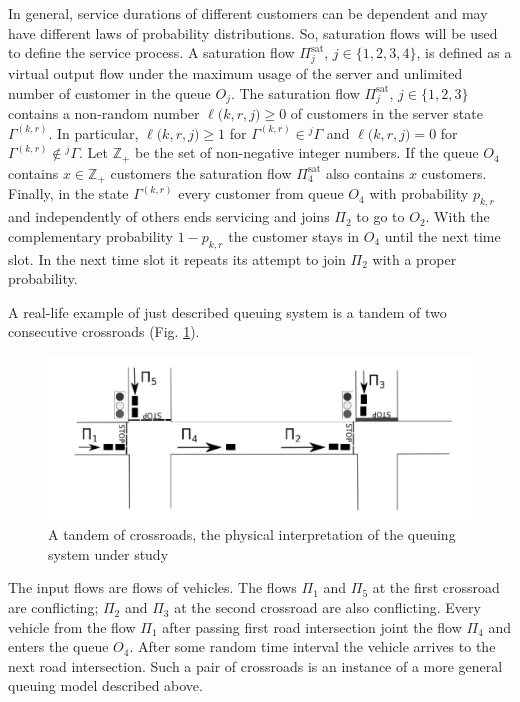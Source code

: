 \documentclass[runningheads,a4paper]{llncs}
\begin{document}
In general, service durations of different customers can be dependent and may have different laws of
probability distributions. So, saturation flows will be used to define the service process. A
saturation flow $\Pi^{\mathrm{\text{sat}}}_j$, $j \in \{1,2,3,4\}$, is defined as a virtual output
flow under the maximum usage of the server and unlimited number of customer in the queue $O_j$. The
saturation flow $\Pi^{\mathrm{\text{sat}}}_j$, $j\in \{1,2,3\}$ contains a non-random number
$\ell({k,r,j)}\geqslant0$ of customers in the server state $\Gamma^{(k,r)}$. In particular,
$\ell({k,r,j)}\geqslant1$ for $\Gamma^{(k,r)}\in{}^j\Gamma$ and $\ell({k,r,j)}=0$ for
$\Gamma^{(k,r)}\not\in{}^j\Gamma$. Let $\mathbb{Z}_+$ be
the set of non-negative integer numbers. If the queue $O_4$ contains $x \in \mathbb{Z}_+$ customers
the saturation flow $\Pi^{\mathrm{\text{sat}}}_4$ also contains $x$ customers.  Finally, in the
state $\Gamma^{(k,r)}$ every customer from queue $O_4$ with probability $p_{k,r}$ and independently
of others ends servicing and joins $\Pi_2$ to go to $O_2$. With the complementary probability
$1-p_{k,r}$ the customer stays in $O_4$ until the next time slot. In the next time slot it repeats
its attempt to join $\Pi_2$ with a proper probability.




A real-life example of just described queuing system is a tandem of two consecutive crossroads
(Fig. \ref{crossroads}).
\begin{figure}[h!]
   \centering
    \includegraphics[width=\textwidth]{Crossroads.pdf} 
    \caption {A tandem of crossroads, the physical interpretation of the queuing system under study}
    \label{crossroads}
\end{figure}
The input flows are flows of vehicles. The flows $\Pi_1$ and $\Pi_5$ at the first crossroad are
conflicting; $\Pi_2$ and $\Pi_3$ at the second crossroad are also conflicting. Every vehicle from
the flow $\Pi_1$ after passing first road intersection joint the flow $\Pi_4$ and enters the queue
$O_4$. After some random time interval the vehicle arrives to the next road intersection. Such a pair
of crossroads is an instance of a more general queuing model described above.
\end{document}
